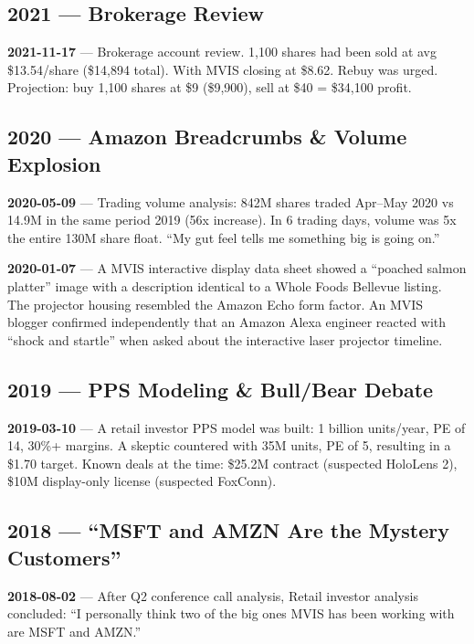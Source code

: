 \documentclass[11pt,letterpaper]{article}
\begin{document}
\subsection*{2021 --- Brokerage Review}

{\color{datecyan}\textbf{2021-11-17}} --- Brokerage account review. 1,100 shares had been sold at avg \$13.54/share (\$14,894 total). With MVIS closing at \$8.62. Rebuy was urged. Projection: buy 1,100 shares at \$9 (\$9,900), sell at \$40 = \$34,100 profit.

\subsection*{2020 --- Amazon Breadcrumbs \& Volume Explosion}

{\color{datecyan}\textbf{2020-05-09}} --- Trading volume analysis: 842M shares traded Apr--May 2020 vs 14.9M in the same period 2019 (56x increase). In 6 trading days, volume was 5x the entire 130M share float. ``My gut feel tells me something big is going on.''

{\color{datecyan}\textbf{2020-01-07}} --- A MVIS interactive display data sheet showed a ``poached salmon platter'' image with a description identical to a Whole Foods Bellevue listing. The projector housing resembled the Amazon Echo form factor. An MVIS blogger confirmed independently that an Amazon Alexa engineer reacted with ``shock and startle'' when asked about the interactive laser projector timeline.

\subsection*{2019 --- PPS Modeling \& Bull/Bear Debate}

{\color{datecyan}\textbf{2019-03-10}} --- A retail investor PPS model was built: 1 billion units/year, PE of 14, 30\%+ margins. A skeptic countered with 35M units, PE of 5, resulting in a \$1.70 target. Known deals at the time: \$25.2M contract (suspected HoloLens 2), \$10M display-only license (suspected FoxConn).

\subsection*{2018 --- ``MSFT and AMZN Are the Mystery Customers''}

{\color{datecyan}\textbf{2018-08-02}} --- After Q2 conference call analysis, Retail investor analysis concluded: ``I personally think two of the big ones MVIS has been working with are MSFT and AMZN.''
\end{document}
